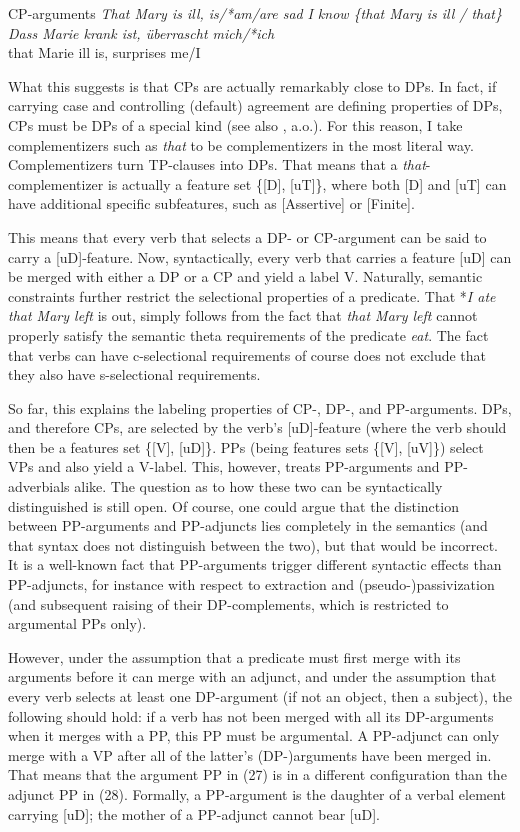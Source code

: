 \documentclass[output=paper
,modfonts
,nonflat]{langsci/langscibook}
\begin{document}
\begin{exe}
\ex CP-arguments
	\xlist
	\ex \textit{That Mary is ill, is/*am/are sad}
	\ex \textit{I know \{that Mary is ill / that\}}
	\ex \textit{Dass Marie krank ist, überrascht mich/*ich}\\
		that Marie ill is, surprises me/I
	\endxlist
\end{exe}
What this suggests is that CPs are actually remarkably close to DPs. In fact, if carrying case and controlling (default) agreement are defining properties of DPs, CPs must be DPs of a special kind (see also \citealt{Kayne2010}, a.o.). For this reason, I take complementizers such as \textit{that} to be complementizers in the most literal way. Complementizers turn TP-clauses into DPs. That means that a \textit{that}{}-complementizer is actually a feature set \{[D], [uT]\}, where both [D] and [uT] can have additional specific subfeatures, such as [Assertive] or [Finite].

This means that every verb that selects a DP- or CP-argument can be said to carry a [uD]-feature. Now, syntactically, every verb that carries a feature [uD] can be merged with either a DP or a CP and yield a label V. Naturally, semantic constraints further restrict the selectional properties of a predicate. That *\textit{I ate that Mary left} is out, simply follows from the fact that \textit{that Mary left} cannot properly satisfy the semantic theta requirements of the predicate \textit{eat}. The fact that verbs can have c-selectional requirements of course does not exclude that they also have s-selectional requirements.

So far, this explains the labeling properties of CP-, DP-, and PP-arguments. DPs, and therefore CPs, are selected by the verb’s [uD]-feature (where the verb should then be a features set \{[V], [uD]\}. PPs (being features sets \{[V], [uV]\}) select VPs and also yield a V-label. This, however, treats PP-arguments and PP-adverbials alike. The question as to how these two can be syntactically distinguished is still open. Of course, one could argue that the distinction between PP-arguments and PP-adjuncts lies completely in the semantics (and that syntax does not distinguish between the two), but that would be incorrect. It is a well-known fact that PP-arguments trigger different syntactic effects than PP-adjuncts, for instance with respect to extraction and (pseudo-)passivization (and subsequent raising of their DP-complements, which is restricted to argumental PPs only). 

However, under the assumption that a predicate must first merge with its arguments before it can merge with an adjunct, and under the assumption that every verb selects at least one DP-argument (if not an object, then a subject), the following should hold: if a verb has not been merged with all its DP-arguments when it merges with a PP, this PP must be argumental. A PP-adjunct can only merge with a VP after all of the latter’s (DP-)arguments have been merged in. That means that the argument PP in (27) is in a different configuration than the adjunct PP in (28). Formally, a PP-argument is the daughter of a verbal element carrying [uD]; the mother of a PP-adjunct cannot bear [uD]. 
\end{document}

